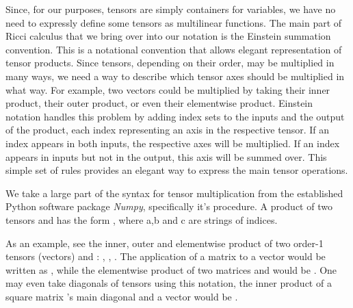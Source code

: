 \documentclass[12pt, a4paper]{report}
\begin{document}
Since, for our purposes, tensors are simply containers for variables, we have no need to expressly define some tensors as multilinear functions.
The main part of Ricci calculus that we bring over into our notation is the Einstein summation convention.
This is a notational convention that allows elegant representation of tensor products.
Since tensors, depending on their order, may be multiplied in many ways, we need a way to describe which tensor axes should be multiplied in what way.
For example, two vectors could be multiplied by taking their inner product, their outer product, or even their elementwise product.
Einstein notation handles this problem by adding index sets to the inputs and the output of the product, each index representing an axis in the respective tensor.
If an index appears in both inputs, the respective axes will be multiplied.
If an index appears in inputs but not in the output, this axis will be summed over.
This simple set of rules provides an elegant way to express the main tensor operations.

We take a large part of the syntax for tensor multiplication from the established Python software package \textit{Numpy}, specifically it's  procedure.
A product of two tensors  and  has the form , where a,b and c are strings of indices.

As an example, see the inner, outer and elementwise product of two order-1 tensors (vectors)  and : , , .
The application of a matrix  to a vector  would be written as , while the elementwise product of two matrices  and  would be .
One may even take diagonals of tensors using this notation, the inner product of a square matrix 's main diagonal and a vector  would be .
\end{document}
